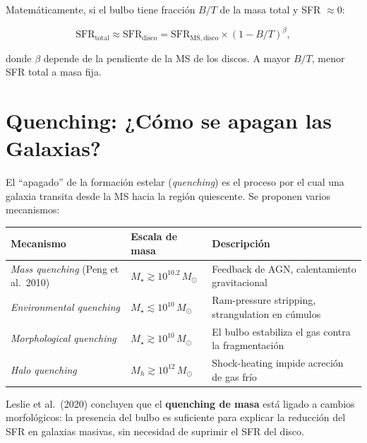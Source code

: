 \documentclass[12pt, a4paper]{article}
\begin{document}
Matemáticamente, si el bulbo tiene fracción $B/T$ de la masa total y SFR $\approx 0$:

\begin{equation}
    \mathrm{SFR}_{\mathrm{total}} \approx \mathrm{SFR}_{\mathrm{disco}}
    = \mathrm{SFR}_{\mathrm{MS,disco}} \times (1 - B/T)^{\beta},
    \label{eq:bulge}
\end{equation}

donde $\beta$ depende de la pendiente de la MS de los discos. A mayor $B/T$,
menor SFR total a masa fija.

\section{Quenching: ¿Cómo se apagan las Galaxias?}

El ``apagado'' de la formación estelar (\textit{quenching}) es el proceso
por el cual una galaxia transita desde la MS hacia la región quiescente.
Se proponen varios mecanismos:

\begin{center}
\begin{tabular}{p{3.5cm} p{4cm} p{4.5cm}}
\toprule
\textbf{Mecanismo} & \textbf{Escala de masa} & \textbf{Descripción} \\
\midrule
\textit{Mass quenching} (Peng et al.\ 2010)
    & $M_\star \gtrsim 10^{10.2}\,M_\odot$
    & Feedback de AGN, calentamiento gravitacional \\[6pt]
\textit{Environmental quenching}
    & $M_\star \lesssim 10^{10}\,M_\odot$
    & Ram-pressure stripping, strangulation en cúmulos \\[6pt]
\textit{Morphological quenching}
    & $M_\star \gtrsim 10^{10}\,M_\odot$
    & El bulbo estabiliza el gas contra la fragmentación \\[6pt]
\textit{Halo quenching}
    & $M_h \gtrsim 10^{12}\,M_\odot$
    & Shock-heating impide acreción de gas frío \\
\bottomrule
\end{tabular}
\end{center}

Leslie et al.\ (2020) concluyen que el \textbf{quenching de masa} está ligado
a cambios morfológicos: la presencia del bulbo es suficiente para explicar la
reducción del SFR en galaxias masivas, sin necesidad de suprimir el SFR del disco.
\end{document}
